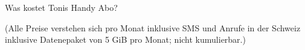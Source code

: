 \begin{bbwAufgabenBlock}
Was kostet Tonis Handy Abo?


{\tiny{(Alle Preise verstehen sich pro Monat inklusive SMS und Anrufe in der Schweiz inklusive Datenepaket von 5 GiB pro Monat; nicht kumulierbar.)}}




\end{bbwAufgabenBlock}


\platzFuerBerechnungenBisEndeSeite{}%
%
